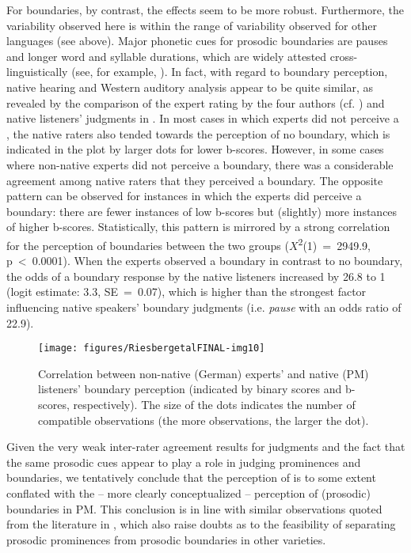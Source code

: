 \documentclass[output=paper
,modfonts
,nonflat]{langsci/langscibook}
\begin{document}
For boundaries, by contrast, the effects seem to be more robust. Furthermore, the variability observed here is within the range of variability observed for other languages (see  above). Major phonetic cues for prosodic boundaries are pauses and longer word and syllable durations, which are widely attested cross-linguistically (see, for example, \citealt{Turk2007}). In fact, with regard to boundary perception, native hearing and Western auditory analysis appear to be quite similar, as revealed by the comparison of the expert rating by the four authors (cf. ) and native listeners’ judgments in . In most cases in which experts did not perceive a , the native raters also tended towards the perception of no boundary, which is indicated in the plot by larger dots for lower b-scores. However, in some cases where non-native experts did not perceive a boundary, there was a considerable agreement among native raters that they perceived a boundary. The opposite pattern can be observed for instances in which the experts did perceive a boundary: there are fewer instances of low b-scores but (slightly) more instances of higher b-scores. Statistically, this pattern is mirrored by a strong correlation for the perception of boundaries between the two groups (\textit{$X$}\textsuperscript{2}(1)~=~2949.9, p~<~0.0001). When the experts observed a boundary in contrast to no boundary, the odds of a boundary response by the native listeners increased by 26.8 to 1 (logit estimate: 3.3, SE~=~0.07), which is higher than the strongest factor influencing native speakers’ boundary judgments (i.e. \textit{pause} with an odds ratio of 22.9).

\begin{figure}
	\texttt{[image: figures/RiesbergetalFINAL-img10]}
	\caption{Correlation between non-native (German) experts' and native (PM) listeners' boundary perception (indicated by binary scores and b-scores, respectively). The size of the dots indicates the number of compatible observations (the more observations, the larger the dot).}
	\label{f:riesberg:10}
\end{figure}

Given the very weak inter-rater agreement results for  judgments and the fact that the same prosodic cues appear to play a role in judging prominences and boundaries, we tentatively conclude that the perception of  is to some extent conflated with the – more clearly conceptualized – perception of (prosodic) boundaries in PM. This conclusion is in line with similar observations quoted from the literature in , which also raise doubts as to the feasibility of separating prosodic prominences from prosodic boundaries in other  varieties.
\end{document}
